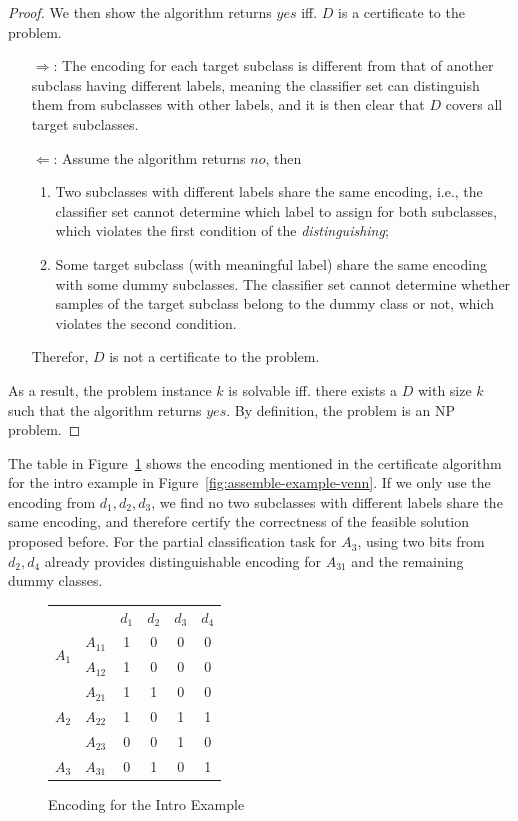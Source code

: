 \documentclass[sigplan,10pt,review]{acmart}\settopmatter{printfolios=true,printccs=false,printacmref=false}
\begin{document}
\begin{proof}
We then show the algorithm returns $yes$ iff. $D$ is a certificate to the problem.
\begin{enumerate}
	\item[$\Rightarrow$:]
	The encoding for each target subclass is different from that of another subclass having different labels, meaning the classifier set can distinguish them from subclasses with other labels, and it is then clear that $D$ covers all target subclasses.
	\item[$\Leftarrow$:]
	Assume the algorithm returns $no$, then
	\begin{enumerate}
		\item Two subclasses with different labels share the same encoding, i.e., the classifier set cannot determine which label to assign for both subclasses, which violates the first condition of the \textit{distinguishing};
		\item Some target subclass (with meaningful label) share the same encoding with some dummy subclasses.
		The classifier set cannot determine whether samples of the target subclass belong to the dummy class or not, which violates the second condition.
	\end{enumerate}
	Therefor, $D$ is not a certificate to the problem.
\end{enumerate}
As a result, the problem instance $k$ is solvable iff. there exists a $D$ with size $k$ such that the algorithm returns $yes$.
By definition, the problem is an NP problem.
\end{proof}

The table in Figure~\ref{fig:assemble-example-encoding} shows the encoding mentioned in the certificate algorithm for the intro example in Figure~\ref{fig:assemble-example-venn}.
If we only use the encoding from $d_1, d_2, d_3$, we find no two subclasses with different labels share the same encoding, and therefore certify the correctness of the feasible solution proposed before.
For the partial classification task for $A_3$, using two bits from $d_2, d_4$ already provides distinguishable encoding for $A_{31}$ and the remaining dummy classes.

\begin{figure}[h]
	\begin{tabular}{|c|c|cccc|}
	\cline{1-6}
	\multicolumn{2}{|c|}{} & $d_1$ & $d_2$ & $d_3$ & $d_4$ \\ \cline{1-6}
	\multirow{2}{*}{$A_1$} & $A_{11}$ & 1 & 0 & 0 & 0 \\ \cline{2-6}
	 & $A_{12}$ & 1 & 0 & 0 & 0 \\ \cline{1-6}
	\multirow{3}{*}{$A_2$} & $A_{21}$ & 1 & 1 & 0 & 0 \\ \cline{2-6}
	 & $A_{22}$ & 1 & 0 & 1 & 1 \\ \cline{2-6}
	 & $A_{23}$ & 0 & 0 & 1 & 0 \\ \cline{1-6}
	$A_3$ & $A_{31}$ & 0 & 1 & 0 & 1 \\ \cline{1-6}
	\end{tabular}
	\caption{Encoding for the Intro Example}
	\label{fig:assemble-example-encoding}
\end{figure}
\end{document}

